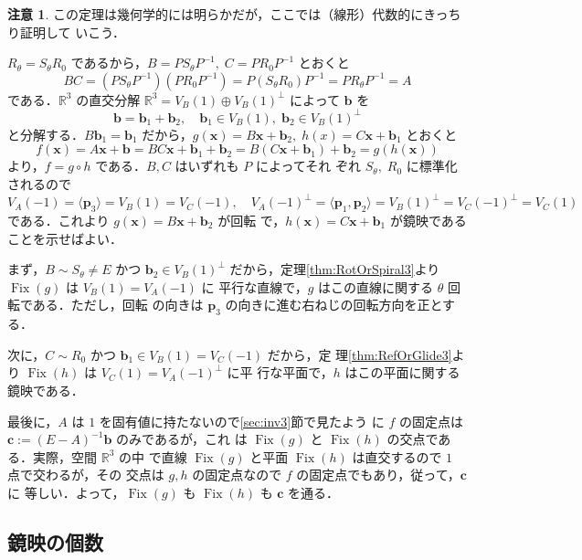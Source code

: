 \documentclass[11pt, uplatex, dvipdfmx, titlepage]{jsarticle}
\makeatletter
\DeclareMathOperator{\Fix}{Fix}
\renewenvironment{proof}[1][\proofname]{\par
  \pushQED{\qed}%
  \normalfont \topsep6\p@\@plus6\p@\relax
  \trivlist
  \item[\hskip\labelsep
         \bfseries
    {#1}]\ignorespaces
}{%
  \popQED\endtrivlist\@endpefalse
}
\theoremstyle{definition}
\renewcommand{\proofname}{\textbf{証明}}
\newtheorem*{remark}{注意}
\makeatother
\begin{document}
\begin{remark}
  この定理は幾何学的には明らかだが，ここでは（線形）代数的にきっちり証明して
  いこう．  
\end{remark}

\begin{proof}
$R_{\theta}=S_{\theta}R_{0}$ であるから，$B=PS_{\theta}P^{-1}, \; C=PR_{0}P^{-1}$ とおくと
\[
  BC = \left(PS_{\theta}P^{-1}\right)\left(PR_{0}P^{-1}\right) = P
  \left( S_{\theta}R_{0}\right)P^{-1} = P R_{\theta} P^{-1}=A
\]
である．$\mathbb{R}^3$ の直交分解 $\mathbb{R}^3 = V_B(1) \oplus
V_B(1)^{\perp}$ によって $\bm{b}$ を
\[
  \bm{b}=\bm{b}_{1} + \bm{b}_{2}, \quad \bm{b}_{1} \in
  V_B(1), \; \bm{b}_2 \in V_B(1)^{\perp}
\]
と分解する．$B \bm{b}_1 = \bm{b}_1$
だから，$g(\bm{x}) = B\bm{x} + \bm{b}_{2}, \; h(x) = C\bm{x}+\bm{b}_1$
とおくと
\[
  f(\bm{x}) = A\bm{x} + \bm{b} = BC\bm{x}+\bm{b}_{1}+\bm{b}_{2} =
  B\left(C\bm{x}+\bm{b}_{1}\right) + \bm{b}_{2} = g(h(\bm{x}))
\]
より，$f= g \circ h$ である．$B, C$ はいずれも $P$ によってそれ
ぞれ $S_{\theta}, \; R_0$ に標準化されるので
\[
  V_A(-1) = \langle \bm{p}_3 \rangle = V_B(1)=V_C(-1), \quad
  V_A(-1)^{\perp} = \langle \bm{p}_1, \bm{p}_2\rangle = V_B(1)^{\perp}
  = V_C(-1)^{\perp}=V_C(1)
\]
である．これより $g(\bm{x})=B\bm{x}+\bm{b}_2$ が回転
で，$h(\bm{x})=C\bm{x}+\bm{b}_1$ が鏡映であることを示せばよい．


まず，$B \sim S_{\theta} \neq E$ かつ $\bm{b}_{2} \in V_B(1)^{\perp}$
だから，定理\ref{thm:RotOrSpiral3}より $\Fix(g)$ は $V_B(1)=V_A(-1)$ に
平行な直線で，$g$ はこの直線に関する $\theta$ 回転である．ただし，回転
の向きは $\bm{p}_3$ の向きに進む右ねじの回転方向を正とする．

次に，$C \sim R_0$ かつ $\bm{b}_1 \in V_B(1)=V_C(-1)$ だから，定
理\ref{thm:RefOrGlide3}より $\Fix(h)$ は $V_C(1)=V_A(-1)^{\perp}$ に平
行な平面で，$h$ はこの平面に関する鏡映である．

最後に，$A$ は $1$ を固有値に持たないので\ref{sec:inv3}節で見たよう
に $f$ の固定点は $\bm{c}:=(E-A)^{-1}\bm{b}$ のみであるが，これ
は $\Fix(g)$ と $\Fix(h)$ の交点である．実際，空間 $\mathbb{R}^3$ の中
で直線 $\Fix(g)$ と平面 $\Fix(h)$ は直交するので $1$ 点で交わるが，その
交点は $g, h$ の固定点なので $f$ の固定点でもあり，従って，$\bm{c}$ に
等しい．よって，$\Fix(g)$ も $\Fix(h)$ も $\bm{c}$ を通る．
\end{proof}


\subsection{鏡映の個数}
\end{document}
